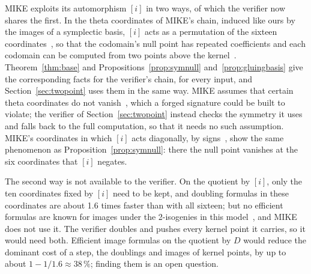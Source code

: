 \documentclass[version=preprint]{iacrcc}
\begin{document}
    MIKE exploits its automorphism $[i]$ in two ways, of which the verifier
    now shares the first. In the theta coordinates of MIKE's chain, induced
    like ours by the images of a symplectic basis, $[i]$ acts as a permutation
    of the sixteen coordinates~\cite[Corollary G.3]{BDD+26}, so that the
    codomain's null point has repeated coefficients and each codomain can be
    computed from two points above the kernel~\cite[Theorem E.1]{BDD+26}.
    Theorem~\ref{thm:base} and Propositions~\ref{prop:symnull}
    and~\ref{prop:gluingbasis} give the corresponding facts for the
    verifier's chain, for every input, and Section~\ref{sec:twopoint} uses them
    in the same way. MIKE assumes that certain theta coordinates do not
    vanish~\cite[Heuristic E.1]{BDD+26}, which a forged signature could be
    built to violate; the verifier of Section~\ref{sec:twopoint} instead checks
    the symmetry it uses and falls back to the full computation, so that it
    needs no such assumption. MIKE's coordinates in which $[i]$ acts diagonally,
    by signs~\cite[Definition G.1 and Proposition G.3]{BDD+26}, show the same
    phenomenon as Proposition~\ref{prop:symnull}: there the null point vanishes
    at the six coordinates that $[i]$ negates.

    The second way is not available to the verifier. On the quotient by $[i]$,
    only the ten coordinates fixed by $[i]$ need to be kept, and doubling
    formulas in these coordinates are about 1.6 times faster than with all
    sixteen; but no efficient formulas are known for images under the
    2-isogenies in this model~\cite[Remark E.2]{BDD+26}, and MIKE does not use
    it. The verifier doubles and pushes every kernel point it carries, so it
    would need both. Efficient image formulas on the quotient by $D$ would
    reduce the dominant cost of a step, the doublings and images of kernel
    points, by up to about $1 - 1/1.6 \approx 38\,\%$; finding them is an open
    question.
\end{document}
